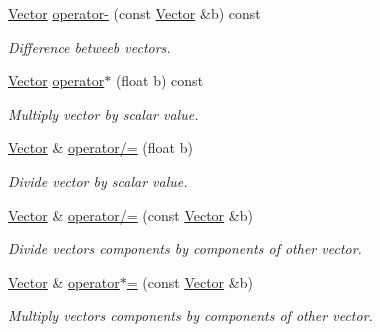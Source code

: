 \begin{DoxyCompactItemize}
\mbox{\label{struct_vector_aa01edc71eb1c937b8e86db4a638f9b8b}} 
\mbox{\hyperlink{struct_vector}{Vector}} \mbox{\hyperlink{struct_vector_aa01edc71eb1c937b8e86db4a638f9b8b}{operator-\/}} (const \mbox{\hyperlink{struct_vector}{Vector}} \&b) const
\begin{DoxyCompactList}\small\item\em Difference betweeb vectors. \end{DoxyCompactList}\item 
\mbox{\label{struct_vector_abf5f2cdae535d5f0166f528dfcd49d99}} 
\mbox{\hyperlink{struct_vector}{Vector}} \mbox{\hyperlink{struct_vector_abf5f2cdae535d5f0166f528dfcd49d99}{operator$\ast$}} (float b) const
\begin{DoxyCompactList}\small\item\em Multiply vector by scalar value. \end{DoxyCompactList}\item 
\mbox{\label{struct_vector_a9f3aff4a5623fce9355c12bdd6351189}} 
\mbox{\hyperlink{struct_vector}{Vector}} \& \mbox{\hyperlink{struct_vector_a9f3aff4a5623fce9355c12bdd6351189}{operator/=}} (float b)
\begin{DoxyCompactList}\small\item\em Divide vector by scalar value. \end{DoxyCompactList}\item 
\mbox{\label{struct_vector_a79b51f38cd05649cf37172727c6ea1da}} 
\mbox{\hyperlink{struct_vector}{Vector}} \& \mbox{\hyperlink{struct_vector_a79b51f38cd05649cf37172727c6ea1da}{operator/=}} (const \mbox{\hyperlink{struct_vector}{Vector}} \&b)
\begin{DoxyCompactList}\small\item\em Divide vector\textquotesingle{}s components by components of other vector. \end{DoxyCompactList}\item 
\mbox{\label{struct_vector_adbfa16fc78fee8b5bb502a06edc8872d}} 
\mbox{\hyperlink{struct_vector}{Vector}} \& \mbox{\hyperlink{struct_vector_adbfa16fc78fee8b5bb502a06edc8872d}{operator$\ast$=}} (const \mbox{\hyperlink{struct_vector}{Vector}} \&b)
\begin{DoxyCompactList}\small\item\em Multiply vector\textquotesingle{}s components by components of other vector. \end{DoxyCompactList}\item 

\end{DoxyCompactItemize}
